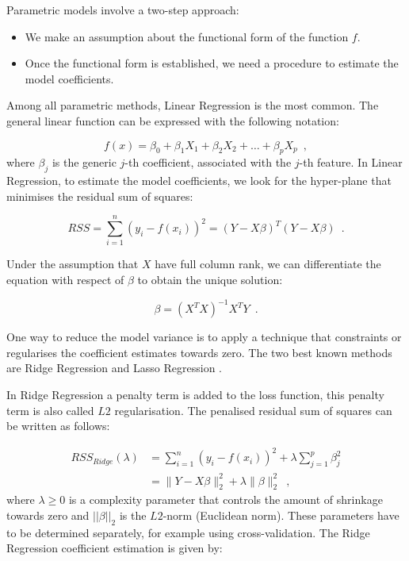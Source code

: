 Parametric models involve a two-step approach:
\begin{itemize}
    \item We make an assumption about the functional form of the function $f$.  
    \item Once the functional form is established, we need a procedure to estimate the model coefficients. 

\end{itemize}
	 
Among all parametric methods, Linear Regression is the most common. The general linear function can be expressed with the following notation:

\begin{equation} \label{eq:linear_function}
    f(x)=\beta_0 + \beta_1X_1 + \beta_2X_2 + \ldots + \beta_pX_p
    \enspace,
\end{equation}
where $\beta_j$ is the generic $j$-th coefficient, associated with the $j$-th feature.
In Linear Regression, to estimate the model coefficients, we look for the hyper-plane that minimises the residual sum of squares:

\begin{equation}
    RSS = \sum_{i=1}^{n}(y_i -f(x_i))^2 = (Y - X\beta)^T(Y - X\beta)
    \enspace.
\end{equation}

Under the assumption that $X$ have full column rank, we can differentiate the equation with respect of $\beta$ to obtain the unique solution:

\begin{equation}
    \beta = (X^TX)^{-1}X^TY
    \enspace.
\end{equation}

One way to reduce the model variance is to apply a technique that constraints or regularises the coefficient estimates towards zero. The two best known methods are Ridge Regression \citep{hoerl1970ridge} and Lasso Regression \citep{tibshirani1996regression}. 

In Ridge Regression a penalty term is added to the loss function, this penalty term is also called $L2$ regularisation. The penalised residual sum of squares can be written as follows:

\begin{equation}
\begin{aligned}
 RSS_{Ridge}(\lambda) & = \sum_{i=1}^{n}(y_i -f(x_i))^2 + \lambda\sum_{j=1}^{p}\beta^{2}_{j} \\
& = \|Y - X\beta\|_2^2 + \lambda\|\beta\|_2^2
    \enspace,
\end{aligned}
\end{equation}
where $ \lambda \geq 0 $ is a complexity parameter that controls the amount of shrinkage towards zero and $||\beta||_2$ is the $L2$-norm (Euclidean norm). These parameters have to be determined separately, for example using cross-validation. The Ridge Regression coefficient estimation is given by:

